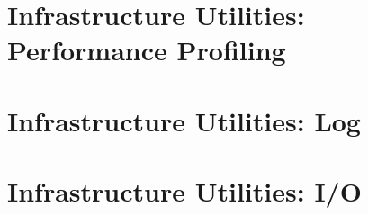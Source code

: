 \documentclass[english]{article}
\newcommand{\shortname}{GR}
\begin{document}
\setcounter{section}{0}
\renewcommand{\thesection}{\shortname\arabic{section}}
\renewcommand{\thesubsection}{\shortname\arabic{section}.\arabic{subsection}}
\renewcommand{\thesubsubsection}{\shortname\arabic{section}.\arabic{subsection}.\arabic{subsubsection}}



\newpage
\begin{htmlonly}
\end{htmlonly}
\part{Infrastructure Utilities: Performance Profiling}

\setcounter{section}{0}
\renewcommand{\thesection}{\shortname\arabic{section}}
\renewcommand{\thesubsection}{\shortname\arabic{section}.\arabic{subsection}}
\renewcommand{\thesubsubsection}{\shortname\arabic{section}.\arabic{subsection}.\arabic{subsubsection}}



\newpage
\begin{htmlonly}
\end{htmlonly}
\part{Infrastructure Utilities: Log}

\setcounter{section}{0}
\renewcommand{\thesection}{\shortname\arabic{section}}
\renewcommand{\thesubsection}{\shortname\arabic{section}.\arabic{subsection}}
\renewcommand{\thesubsubsection}{\shortname\arabic{section}.\arabic{subsection}.\arabic{subsubsection}}



\newpage
\begin{htmlonly}
\end{htmlonly}
\part{Infrastructure Utilities: I/O}
\label{part:Infrastructure Utilities:_I/O}

\setcounter{section}{0}
\renewcommand{\thesection}{\shortname\arabic{section}}
\renewcommand{\thesubsection}{\shortname\arabic{section}.\arabic{subsection}}
\renewcommand{\thesubsubsection}{\shortname\arabic{section}.\arabic{subsection}.\arabic{subsubsection}}
\end{document}
